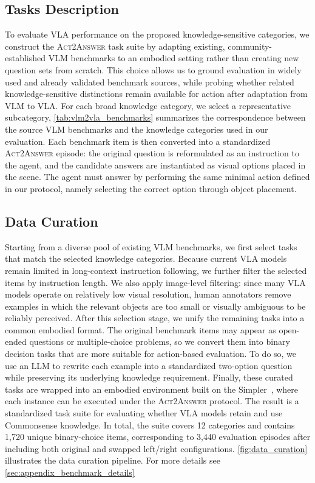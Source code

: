 \documentclass[11pt]{article}
\begin{document}
\subsection{Tasks Description}

To evaluate VLA performance on the proposed knowledge-sensitive categories, we construct the \textsc{Act2Answer} task suite by adapting existing, community-established VLM benchmarks to an embodied setting rather than creating new question sets from scratch. This choice allows us to ground evaluation in widely used and already validated benchmark sources, while probing whether related knowledge-sensitive distinctions remain available for action after adaptation from VLM to VLA. For each broad knowledge category, we select a representative subcategory, \autoref{tab:vlm2vla_benchmarks} summarizes the correspondence between the source VLM benchmarks and the knowledge categories used in our evaluation. Each benchmark item is then converted into a standardized \textsc{Act2Answer} episode: the original question is reformulated as an instruction to the agent, and the candidate answers are instantiated as visual options placed in the scene. The agent must answer by performing the same minimal action defined in our protocol, namely selecting the correct option through object placement. 

\subsection{Data Curation}

Starting from a diverse pool of existing VLM benchmarks, we first select tasks that match the selected knowledge categories. Because current VLA models remain limited in long-context instruction following, we further filter the selected items by instruction length. We also apply image-level filtering: since many VLA models operate on relatively low visual resolution, human annotators remove examples in which the relevant objects are too small or visually ambiguous to be reliably perceived. After this selection stage, we unify the remaining tasks into a common embodied format. The original benchmark items may appear as open-ended questions or multiple-choice problems, so we convert them into binary decision tasks that are more suitable for action-based evaluation. To do so, we use an LLM to rewrite each example into a standardized two-option question while preserving its underlying knowledge requirement. Finally, these curated tasks are wrapped into an embodied environment built on the Simpler~\citep{simpler}, where each instance can be executed under the \textsc{Act2Answer} protocol. The result is a standardized task suite for evaluating whether VLA models retain and use Commonsense knowledge. In total, the suite covers 12 categories and contains 1,720 unique binary-choice items, corresponding to 3,440 evaluation episodes after including both original and swapped left/right configurations. \autoref{fig:data_curation} illustrates the data curation pipeline. For more details see \autoref{sec:appendix_benchmark_details}
\end{document}
